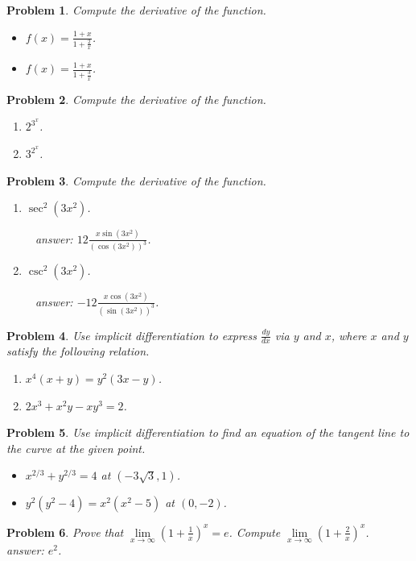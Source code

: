 \documentclass{article}
\newtheorem{problem}{Problem}
\begin{document}
\begin{problem}
Compute the derivative of the function.
\begin{itemize}
\item $f(x)=\frac{1+x }{1+\frac{2}x}$.
\hfill{~}  
\item $f(x)=\frac{1+x }{1+\frac{3}x}$.
\hfill{~}  
\end{itemize}
\end{problem}
\begin{problem}Compute the derivative of the function.
\begin{enumerate}
\item $2^{3^x}$.
\hfill{~}  
\item $3^{2^x}$.
\hfill{~}  
\end{enumerate}
\end{problem}
\begin{problem}Compute the derivative of the function.
\begin{enumerate}
\item $\sec^2 (3x^2)$.

\hfill{~}  
{
answer:
$
12 \frac{x\sin{}(3 x^{2}) }{(\cos{}(3 x^{2}))^{3}}
$.
}
\item $\csc^2 (3x^2)$.

\hfill{~}  
{
answer: $-12 \frac{ x  \cos{}(3 x^{2}) }{(\sin{}(3 x^{2}))^{3}}$.
}
\end{enumerate}
\end{problem}
\begin{problem}
Use implicit differentiation to express $\frac{dy}{dx}$ via $y $ and $x$, where $x$ and $y$ satisfy the following relation.
\begin{enumerate}
\item  $x^4(x+y)=y^2(3x-y)$.
\item $2x^3+x^2y-xy^3=2$.
\end{enumerate}
\end{problem}

\begin{problem}
Use implicit differentiation to find an equation of the tangent line to the curve at the given point.
\begin{itemize}
\item $x^{2/3}+y^{2/3}=4$ at $(-3\sqrt{3}, 1)$.
\item $y^2(y^2-4)= x^2(x^2-5) $ at $(0,-2)$.
\end{itemize}
\end{problem}
\begin{problem}
Prove that $\lim\limits_{x\to \infty} \left( 1+ \frac{1}x \right)^x=e$. Compute $\lim\limits_{x\to \infty} \left( 1+ \frac{2}{x} \right)^x$. 
\hfill{~}  
{
answer:
$
e^2
$.
}
\end{problem}
\end{document}

